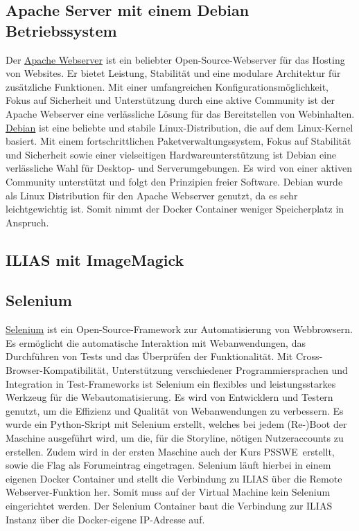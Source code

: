 \documentclass[10pt, a4paper,onecolumn ,titlepage]{article}
\begin{document}
    \subsection{Apache Server mit einem Debian Betriebssystem}
    \label{subsec:apacheServer}
    Der \href{https://httpd.apache.org/}{Apache Webserver} ist ein beliebter Open-Source-Webserver für das Hosting von Websites.
    Er bietet Leistung, Stabilität und eine modulare Architektur für zusätzliche Funktionen.
    Mit einer umfangreichen Konfigurationsmöglichkeit, Fokus auf Sicherheit und Unterstützung durch eine aktive Community ist der Apache Webserver eine verlässliche Lösung für das Bereitstellen von Webinhalten.
    \href{https://www.debian.org/}{Debian} ist eine beliebte und stabile Linux-Distribution, die auf dem Linux-Kernel basiert.
    Mit einem fortschrittlichen Paketverwaltungssystem, Fokus auf Stabilität und Sicherheit sowie einer vielseitigen Hardwareunterstützung ist Debian eine verlässliche Wahl für Desktop- und Serverumgebungen.
    Es wird von einer aktiven Community unterstützt und folgt den Prinzipien freier Software.
    Debian wurde als Linux Distribution für den Apache Webserver genutzt, da es sehr leichtgewichtig ist.
    Somit nimmt der Docker Container weniger Speicherplatz in Anspruch.

    \subsection{ILIAS mit ImageMagick}
    \label{subsec:iliasTechnologie}


    \subsection{Selenium}
    \label{subsec:selenium}
    \href{https://www.selenium.dev}{Selenium} ist ein Open-Source-Framework zur Automatisierung von Webbrowsern.
    Es ermöglicht die automatische Interaktion mit Webanwendungen, das Durchführen von Tests und das Überprüfen der Funktionalität.
    Mit Cross-Browser-Kompatibilität, Unterstützung verschiedener Programmiersprachen und Integration in Test-Frameworks ist Selenium ein flexibles und leistungsstarkes Werkzeug für die Webautomatisierung.
    Es wird von Entwicklern und Testern genutzt, um die Effizienz und Qualität von Webanwendungen zu verbessern.
    Es wurde ein Python-Skript mit Selenium erstellt, welches bei jedem (Re-)Boot der Maschine ausgeführt wird, um die, für die Storyline, nötigen Nutzeraccounts zu erstellen.
    Zudem wird in der ersten Maschine auch der Kurs \glqq PSSWE\grqq\ erstellt, sowie die Flag als Forumeintrag eingetragen.
    Selenium läuft hierbei in einem eigenen Docker Container und stellt die Verbindung zu ILIAS über die Remote Webserver-Funktion her.
    Somit muss auf der Virtual Machine kein Selenium eingerichtet werden.
    Der Selenium Container baut die Verbindung zur ILIAS Instanz über die Docker-eigene IP-Adresse auf.
\end{document}

